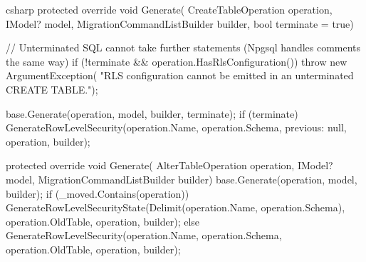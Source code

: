 \begin{sourcecode}{csharp}
protected override void Generate(
    CreateTableOperation operation, IModel? model,
    MigrationCommandListBuilder builder, bool terminate = true)
{
    // Unterminated SQL cannot take further statements (Npgsql handles comments the same way)
    if (!terminate && operation.HasRlsConfiguration())
        throw new ArgumentException(
            "RLS configuration cannot be emitted in an unterminated CREATE TABLE.");

    base.Generate(operation, model, builder, terminate);
    if (terminate)
        GenerateRowLevelSecurity(operation.Name, operation.Schema, previous: null,
            operation, builder);
}

protected override void Generate(
    AlterTableOperation operation, IModel? model, MigrationCommandListBuilder builder)
{
    base.Generate(operation, model, builder);
    if (_moved.Contains(operation))
        GenerateRowLevelSecurityState(Delimit(operation.Name, operation.Schema),
            operation.OldTable, operation, builder);
    else
        GenerateRowLevelSecurity(operation.Name, operation.Schema, operation.OldTable,
            operation, builder);
}
\end{sourcecode}

